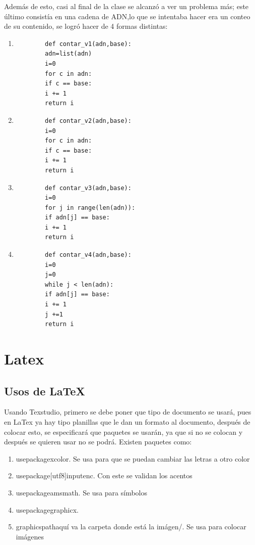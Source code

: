 \documentclass{book}
\begin{document}
	Además de esto, casi al final de la clase se alcanzó a ver un problema más; este último consistía en una cadena de ADN,lo que se intentaba hacer era un conteo de su contenido, se logró hacer de 4 formas distintas:
	\begin{enumerate}
		\item 
		\begin{verbatim}
		def contar_v1(adn,base):
		adn=list(adn)
		i=0
		for c in adn:
		if c == base:
		i += 1
		return i
		\end{verbatim}
		\item 
		\begin{verbatim}
		def contar_v2(adn,base):
		i=0
		for c in adn:
		if c == base:
		i += 1
		return i
		\end{verbatim}
		\item 
		\begin{verbatim}
		def contar_v3(adn,base):
		i=0
		for j in range(len(adn)):
		if adn[j] == base:
		i += 1
		return i
		\end{verbatim}
		\item
		\begin{verbatim} 
		def contar_v4(adn,base):
		i=0
		j=0
		while j < len(adn):
		if adn[j] == base:
		i += 1
		j +=1
		return i
		\end{verbatim}
	\end{enumerate}
		
	\chapter{Latex}
	\section{Usos de LaTeX}
	
	Usando Texstudio, primero se debe poner que tipo de documento se usará, pues en LaTex ya hay tipo planillas que le dan un formato al documento, después de colocar esto, se especificará que paquetes se usarán, ya que si no se colocan y después se quieren usar no se podrá. Existen paquetes como:
	\begin{enumerate}
		\item
		usepackage{xcolor}. Se usa para que se puedan cambiar las letras a otro color
		\item
		usepackage[utf8]{inputenc}. Con este se validan los acentos
		\item
		usepackage{amsmath}. Se usa para símbolos
		\item
		usepackage{graphicx}. 
		\item
		graphicspath{{aquí va la carpeta donde está la imágen/}}. Se usa para colocar imágenes
	\end{enumerate}
\end{document}
